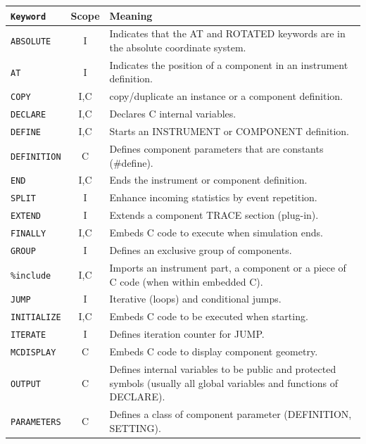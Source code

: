 \begin{table}
  \begin{center}
    {\let\my=\\
    \begin{tabular}{|l|c|p{}|}
      \hline
      \texttt{Keyword} & Scope & Meaning \\
      \hline
      \texttt{ABSOLUTE} & I & Indicates that the AT and ROTATED keywords are in the absolute coordinate system. \\
      \texttt{AT} & I & Indicates the position of a component in an instrument definition. \\
      \texttt{COPY}& I,C & copy/duplicate an instance or a component definition. \\
      \texttt{DECLARE} & I,C & Declares C internal variables. \\
      \texttt{DEFINE} & I,C & Starts an INSTRUMENT or COMPONENT definition. \\
      \texttt{DEFINITION} & C & Defines component parameters that are constants (\#define). \\
      \texttt{END} & I,C & Ends the instrument or component definition. \\
      \texttt{SPLIT} & I & Enhance incoming statistics by event repetition. \\
      \texttt{EXTEND} & I & Extends a component TRACE section (plug-in). \\
      \texttt{FINALLY} & I,C & Embeds C code to execute when simulation ends. \\
      \texttt{GROUP} & I & Defines an exclusive group of components. \\
      \texttt{\%include} & I,C & Imports an instrument part, a component or a piece of C code (when within embedded C). \\
      \texttt{JUMP} & I & Iterative (loops) and conditional jumps. \\
      \texttt{INITIALIZE} & I,C & Embeds C code to be executed when starting. \\
      \texttt{ITERATE} & I & Defines iteration counter for JUMP. \\
      \texttt{MCDISPLAY} & C & Embeds C code to display component geometry. \\
      \texttt{OUTPUT} & C & Defines internal variables to be public and protected symbols (usually all global variables and functions of DECLARE).\\
      \texttt{PARAMETERS} & C & Defines a class of component parameter (DEFINITION, SETTING). \\

\end{tabular}}
\end{center}
\end{table}
